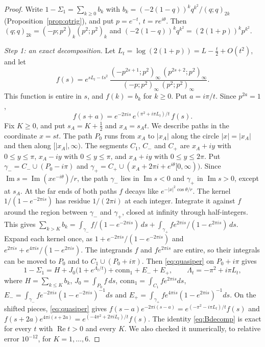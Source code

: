 \documentclass[11pt]{article}
\theoremstyle{plain}
\theoremstyle{definition}
\theoremstyle{remark}
\renewcommand{\Re}{\operatorname{Re}}
\theoremstyle{plain}\newtheorem*{maintheorem}{Main Theorem}
\begin{document}
\begin{proof}
Write $1-\Sigma_1=\sum_{k\ge0}b_k$ with $b_k=(-2(1-q))^kq^{k^2}/(q;q)_{2k}$
(Proposition~\ref{prop:qtrig}), and put $p=e^{-t}$, $t=re^{i\theta}$. Then
$(q;q)_{2k}=(-p;p^2)_k(p^2;p^2)_k$ and $(-2(1-q))^kq^{k^2}=(2(1+p))^kp^{k^2}$.

\emph{Step 1: an exact decomposition.} Let $L_t=\log(2(1+p))=L-\tfrac t2+O(t^2)$, and let
\[
   f(s)=e^{sL_t-ts^2}\,
   \frac{(-p^{2s+1};p^2)_\infty\,(p^{2s+2};p^2)_\infty}{(-p;p^2)_\infty\,(p^2;p^2)_\infty}.
\]
This function is entire in $s$, and $f(k)=b_k$ for $k\ge0$. Put $a=i\pi/t$. Since $p^{2a}=1$,
\begin{equation}\label{eq:quasiper}
   f(s+a)=e^{-2\pi is}\,e^{(\pi^2+i\pi L_t)/t}\,f(s).
\end{equation}
Fix $K\ge0$, and put $s_A=K+\tfrac12$ and $x_A=s_At$. We describe paths in the coordinate $x=st$.
The path $P_0$ runs from $x_A$ to $|x_A|$ along the circle $|x|=|x_A|$ and then along
$[|x_A|,\infty)$. The segments $C_1$, $C_-$ and $C_+$ are $x_A+iy$ with $0\le y\le\pi$, $x_A-iy$
with $0\le y\le\pi$, and $x_A+iy$ with $0\le y\le2\pi$. Put $\gamma_-=C_-\cup(P_0-i\pi)$ and
$\gamma_+=C_+\cup(x_A+2\pi i+e^{i\theta}[0,\infty))$. Since $\operatorname{Im}s=
\operatorname{Im}(xe^{-i\theta})/r$, the path $\gamma_-$ lies in $\operatorname{Im}s<0$ and
$\gamma_+$ in $\operatorname{Im}s>0$, except at $s_A$. At the far ends of both paths $f$ decays
like $e^{-|x|^2\cos\theta/r}$. The kernel $1/(1-e^{-2\pi is})$ has residue $1/(2\pi i)$ at each
integer. Integrate it against $f$ around the region between $\gamma_-$ and $\gamma_+$, closed at
infinity through half-integers. This gives
$\sum_{k>K}b_k=\int_{\gamma_-}f/(1-e^{-2\pi is})\,ds+\int_{\gamma_+}fe^{2\pi is}/(1-e^{2\pi is})\,ds$.
Expand each kernel once, as $1+e^{-2\pi is}/(1-e^{-2\pi is})$ and
$e^{2\pi is}+e^{4\pi is}/(1-e^{2\pi is})$. The integrands $f$ and $fe^{2\pi is}$ are entire, so
their integrals can be moved to $P_0$ and to $C_1\cup(P_0+i\pi)$. Then \eqref{eq:quasiper} on
$P_0+i\pi$ gives
\begin{equation}\label{eq:Bdecomp}
   1-\Sigma_1=H+J_0\bigl(1+e^{\Lambda_t/t}\bigr)+\mathrm{conn}_1+E_-+E_+ ,\qquad
   \Lambda_t=-\pi^2+i\pi L_t,
\end{equation}
where $H=\sum_{k\le K}b_k$, $J_0=\int_{P_0}f\,ds$, $\mathrm{conn}_1=\int_{C_1}fe^{2\pi is}ds$,
$E_-=\int_{\gamma_-}fe^{-2\pi is}(1-e^{-2\pi is})^{-1}ds$ and
$E_+=\int_{\gamma_+}fe^{4\pi is}(1-e^{2\pi is})^{-1}ds$. On the shifted pieces,
\eqref{eq:quasiper} gives $f(s-a)e^{-2\pi i(s-a)}=e^{(-\pi^2-i\pi L_t)/t}f(s)$ and
$f(s+2a)e^{4\pi i(s+2a)}=e^{(-4\pi^2+2\pi iL_t)/t}f(s)$. The identity \eqref{eq:Bdecomp} is exact
for every $t$ with $\Re t>0$ and every $K$. We also checked it numerically, to relative error
$10^{-12}$, for $K=1,\dots,6$.


\end{proof}
\end{document}
